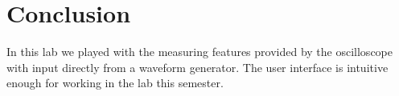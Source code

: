 \documentclass[main.tex]{subfile}
\begin{document}

\section{Conclusion} 
\label{sec:conclusion}

In this lab we played with the measuring features provided by the oscilloscope
with input directly from a waveform generator. The user interface is intuitive
enough for working in the lab this semester.
\end{document}
